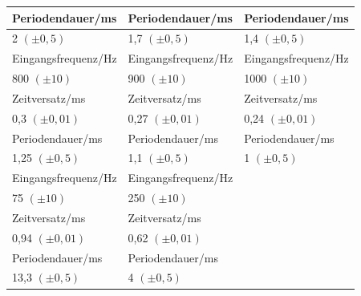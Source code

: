 \documentclass[12pt]{scrartcl}
\begin{document}
\begin{table}[htbp]
\begin{center}
\begin{tabular}{|l|l|l|}
Periodendauer/ms & Periodendauer/ms & Periodendauer/ms \\ \hline
2 $(\pm 0,5)$ & 1,7 $(\pm 0,5)$ & 1,4 $(\pm 0,5)$ \\ \hline \hline
Eingangsfrequenz/Hz & Eingangsfrequenz/Hz & Eingangsfrequenz/Hz \\ \hline
800 $(\pm 10)$ & 900 $(\pm 10)$ & 1000 $(\pm 10)$ \\ \hline
Zeitversatz/ms & Zeitversatz/ms & Zeitversatz/ms \\ \hline
0,3  $(\pm 0,01)$ & 0,27  $(\pm 0,01)$ & 0,24  $(\pm 0,01)$ \\ \hline
Periodendauer/ms & Periodendauer/ms & Periodendauer/ms \\ \hline
1,25 $(\pm 0,5)$ & 1,1 $(\pm 0,5)$ & 1 $(\pm 0,5)$ \\ \hline \hline
Eingangsfrequenz/Hz & Eingangsfrequenz/Hz &  \\ \hline
75 $(\pm 10)$ & 250 $(\pm 10)$ &  \\ \hline
Zeitversatz/ms & Zeitversatz/ms &  \\ \hline
0,94  $(\pm 0,01)$ & 0,62  $(\pm 0,01)$ &  \\ \hline
Periodendauer/ms & Periodendauer/ms &  \\ \hline
13,3 $(\pm 0,5)$ & 4 $(\pm 0,5)$ &  \\ \hline
\end{tabular}
\end{center}
\label{tab:2.3.2}
\end{table}
\end{document}
